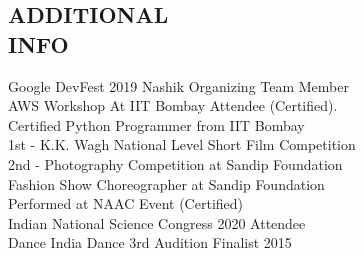 \documentclass[margin, 12pt]{res} %
\begin{document}
\begin{resume}

\section{ADDITIONAL\\INFO} 

Google DevFest 2019 Nashik Organizing Team Member \\
AWS Workshop At IIT Bombay Attendee (Certified).\\
Certified Python Programmer from IIT Bombay\\
1st - K.K. Wagh National Level Short Film Competition\\
2nd - Photography Competition at Sandip Foundation\\
Fashion Show Choreographer at Sandip Foundation \\
Performed at NAAC Event (Certified) \\
Indian National Science Congress 2020 Attendee\\
Dance India Dance 3rd Audition Finalist 2015


\end{resume}
\end{document}
